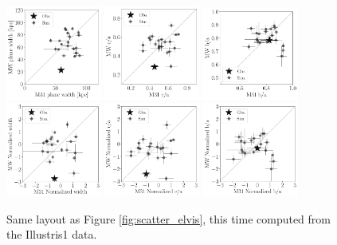 \documentclass[a4paper,fleqn,usenatbib]{mnras}
\begin{document}
\begin{figure}
\centering
\includegraphics[width=0.28\textwidth]{scatter_ranked_width.pdf}
\includegraphics[width=0.28\textwidth]{scatter_ranked_ca_ratio.pdf}
\includegraphics[width=0.28\textwidth]{scatter_ranked_ba_ratio.pdf}
\includegraphics[width=0.28\textwidth]{scatter_norm_ranked_width.pdf}
\includegraphics[width=0.28\textwidth]{scatter_norm_ranked_ca_ratio.pdf}
\includegraphics[width=0.28\textwidth]{scatter_norm_ranked_ba_ratio.pdf}
\caption{Same layout as Figure \ref{fig:scatter_elvis}, this time
  computed from the Illustris1 data.
\label{fig:scatter_illustris}}
\end{figure}
\end{document}
